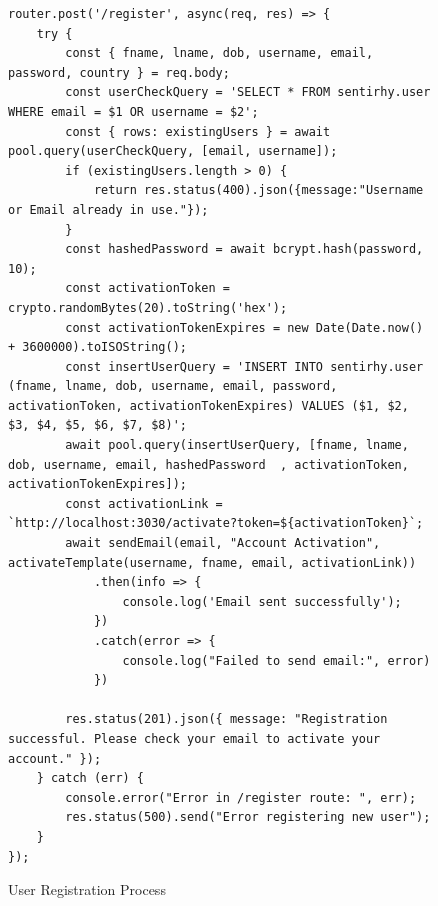 \setcounter{figure}{0}
\setcounter{table}{0}
\begin{figure}[H]
\begin{verbatim}
router.post('/register', async(req, res) => {
    try {
        const { fname, lname, dob, username, email, password, country } = req.body;
        const userCheckQuery = 'SELECT * FROM sentirhy.user WHERE email = $1 OR username = $2';
        const { rows: existingUsers } = await pool.query(userCheckQuery, [email, username]);
        if (existingUsers.length > 0) {
            return res.status(400).json({message:"Username or Email already in use."});
        }
        const hashedPassword = await bcrypt.hash(password, 10);
        const activationToken = crypto.randomBytes(20).toString('hex');
        const activationTokenExpires = new Date(Date.now() + 3600000).toISOString();
        const insertUserQuery = 'INSERT INTO sentirhy.user (fname, lname, dob, username, email, password, activationToken, activationTokenExpires) VALUES ($1, $2, $3, $4, $5, $6, $7, $8)';
        await pool.query(insertUserQuery, [fname, lname, dob, username, email, hashedPassword  , activationToken, activationTokenExpires]);
        const activationLink = `http://localhost:3030/activate?token=${activationToken}`;
        await sendEmail(email, "Account Activation", activateTemplate(username, fname, email, activationLink))
            .then(info => {
                console.log('Email sent successfully');
            })
            .catch(error => {
                console.log("Failed to send email:", error)
            })

        res.status(201).json({ message: "Registration successful. Please check your email to activate your account." });
    } catch (err) {
        console.error("Error in /register route: ", err);
        res.status(500).send("Error registering new user");
    }
});
\end{verbatim}
\caption{User Registration Process}
\label{fig:registering-user}
\end{figure}

\newpage

